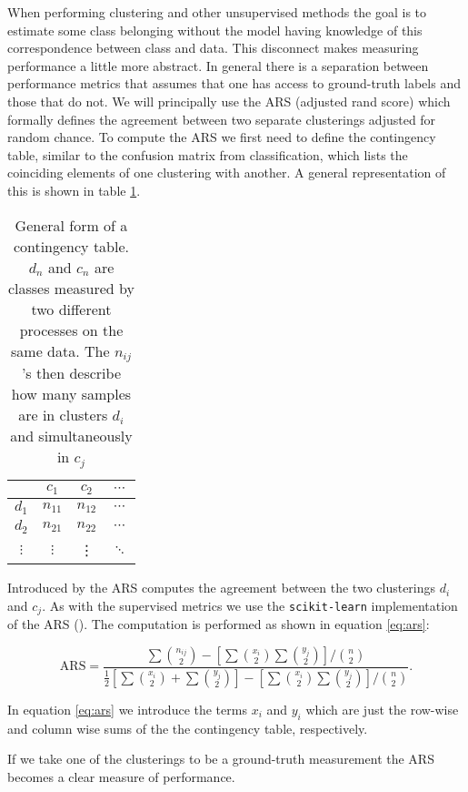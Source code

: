 When performing clustering and other unsupervised methods the goal is to estimate some class belonging without the model having knowledge of this correspondence between class and data. This disconnect makes measuring performance a little more abstract. In general there is a separation between performance metrics that assumes that one has access to ground-truth labels and those that do not. We will principally use the ARS (adjusted rand score) which formally defines the agreement between two separate clusterings adjusted for random chance. To compute the ARS we first need to define the contingency table, similar to the confusion matrix from classification, which lists the coinciding elements of one clustering with another. A general representation of this is shown in table \ref{tab:contingency}. 

\begin{table}
\centering
\caption{General form of a contingency table. $d_n$ and $c_n$ are classes measured by two different processes on the same data. The $n_{ij}$'s then describe how many samples are in clusters $d_i$ and simultaneously in $c_j$}\label{tab:contingency}
\begin{tabular}{c|ccc}
& $c_1$ &$c_2$ & $\cdots$\\
\midrule
$d_1$ & $n_{11}$ & $n_{12}$ &  $\cdots$ \\
$d_2$ & $n_{21}$ & $n_{22}$ &  $\cdots$ \\
$\vdots$ & $\vdots$ & \vdots & $\ddots$ \\
\end{tabular}
\end{table}

Introduced by \cite{Hubert1985} the ARS computes the agreement between the two clusterings $d_i$ and $c_j$. As with the supervised metrics we use the \lstinline{scikit-learn} implementation of the ARS (\cite{Pedregosa2011}). The computation is performed as shown in equation \ref{eq:ars}:

\begin{equation}\label{eq:ars}
\text{ARS} = \frac{\sum  \binom{n_{ij}}{2} - \left[\sum  \binom{x_{i}}{2} \sum  \binom{y_{j}}{2}  \right]/\binom{n}{2}}{\frac{1}{2}\left[\sum  \binom{x_{i}}{2} + \sum  \binom{y_{j}}{2}  \right]- \left[\sum  \binom{x_{i}}{2} \sum  \binom{y_{j}}{2}  \right]/\binom{n}{2}}.
\end{equation}

\noindent In equation \ref{eq:ars} we introduce the terms $x_i$ and $y_i$ which are just the row-wise and column wise sums of the the contingency table, respectively.

If we take one of the clusterings to be a ground-truth measurement the ARS becomes a clear measure of performance. 